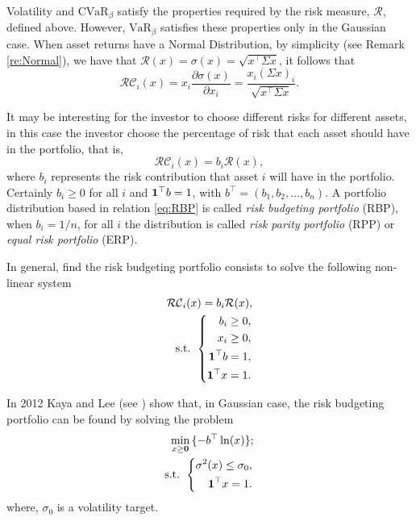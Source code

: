 Volatility and $\mbox{CVaR}_\beta$  satisfy the properties required by the risk measure, $\mathcal{R}$, defined above. However, $\mbox{VaR}_\beta$ satisfies these properties only in the Gaussian case. When asset returns have a Normal Distribution, by simplicity (see Remark \ref{re:Normal}), we have that
$\mathcal{R}(x)=\sigma(x)=\sqrt{x^\top\Sigma x}$, it follows that
\[
\mathcal{RC}_i(x)= x_i \frac{\partial \sigma(x)}{\partial x_i}=\frac{x_i (\Sigma x)_i}{\sqrt{x^\top\Sigma x }}.
\]

It may be interesting for the investor to choose different risks for different assets, in this case the investor choose the percentage of risk that each asset should have in the portfolio, that is,
\begin{equation}\label{eq:RBP}
	\mathcal{RC}_i(x)=b_i\mathcal{R}(x),
\end{equation}
where $b_i$ represents the risk contribution that asset $i$ will have in the portfolio. Certainly $b_i\geq 0$ for all $i$ and
${\bf 1}^\top b =1$, with $b^\top=(b_1, b_2, \dots, b_n)$. A portfolio distribution based in relation \eqref{eq:RBP} is called \textit{risk budgeting portfolio} (RBP), when $b_i=1/n$, for all $i$ the distribution is called \textit{risk parity portfolio} (RPP) or \textit{equal risk portfolio} (ERP).

In general, find the risk budgeting portfolio consists to solve the following non-linear system
\begin{eqnarray}\label{eq:SisNLin}
\mathcal{RC}_i(x)=b_i\mathcal{R}(x), \\
	\mbox{s.t. }\left\{
	\begin{aligned}\nonumber
b_i \geq 0, \\
x_i \geq 0, \\
{\bf 1}^\top b =1, \\
{\bf 1}^\top x =1.
	\end{aligned}
	\right.
\end{eqnarray}

In 2012 Kaya and Lee (see \cite{KayaLee2012}) show that, in Gaussian case, the risk budgeting portfolio can be found by solving the problem
\begin{eqnarray}\label{eq:RPP}
\min_{x\geq \textbf{0}}\, \{-b^\top \ln(x)\}; \\
	\mbox{s.t. }\left\{
	\begin{aligned}\nonumber
\sigma^2(x)\leq \sigma_0,\\
{\bf 1}^\top x =1.
	\end{aligned}
	\right.
\end{eqnarray}
where, $\sigma_0$ is a volatility target.





